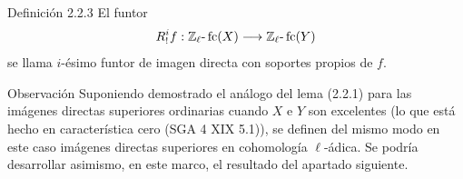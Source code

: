 \begin{statement}{Definición 2.2.3}
El funtor
\[
R^i_!f:\mathbb Z_\ell\text{-}\operatorname{fc}(X)\longrightarrow \mathbb Z_\ell\text{-}\operatorname{fc}(Y)
\]
se llama \(i\)-ésimo funtor de imagen directa con soportes propios de \(f\).
\end{statement}

\begin{statement}{Observación}
Suponiendo demostrado el análogo del lema (2.2.1) para las imágenes directas superiores ordinarias cuando \(X\) e \(Y\) son excelentes (lo que está hecho en característica cero (SGA 4 XIX 5.1)), se definen del mismo modo en este caso imágenes directas superiores en cohomología \(\ell\)-ádica. Se podría desarrollar asimismo, en este marco, el resultado del apartado siguiente.
\end{statement}
